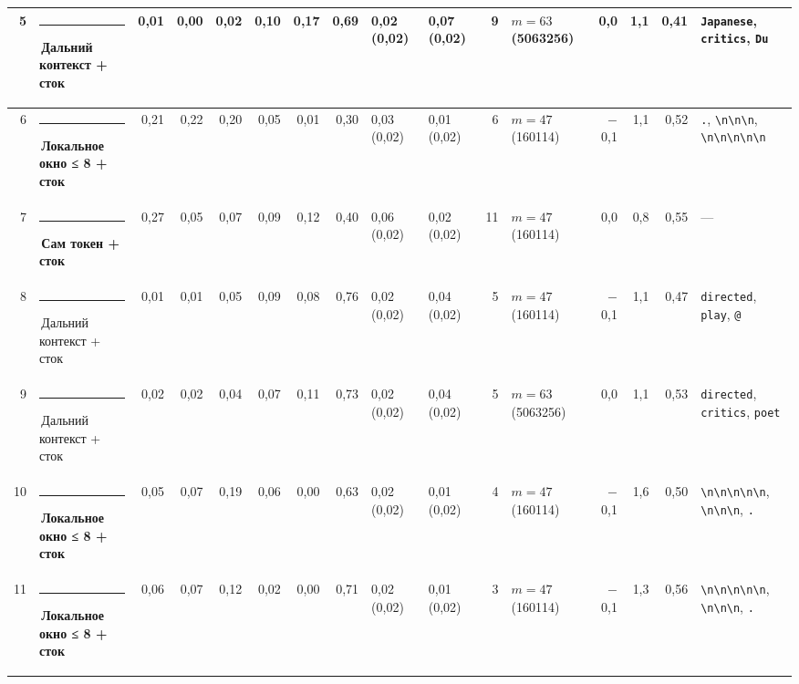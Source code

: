 \documentclass[10pt]{article}
\begin{document}
\begin{minipage}{\linewidth}
\begin{center}
{\begin{tabular}{|r|l|r|r|r|r|r|r|l|l|r|l|r|r|r|l|}
5 & \textcolor[HTML]{C3C2B7}{\rule{0.62em}{0.62em}}\,Дальний контекст + сток & 0,01 & 0,00 & 0,02 & 0,10 & 0,17 & 0,69 & 0,02 (0,02) & 0,07 (0,02) & 9 & $m{=}63$ (5063256) & 0,0 & 1,1 & 0,41 & \texttt{\textvisiblespace{}Japanese}, \texttt{\textvisiblespace{}critics}, \texttt{\textvisiblespace{}Du} \\ \hline
6 & \textcolor[HTML]{1BAF7A}{\rule{0.62em}{0.62em}}\,\textbf{Локальное окно ≤ 8 + сток} & 0,21 & 0,22 & 0,20 & 0,05 & 0,01 & 0,30 & 0,03 (0,02) & 0,01 (0,02) & 6 & $m{=}47$ (160114) & $-$0,1 & 1,1 & 0,52 & \texttt{\textvisiblespace{}.}, \texttt{\textvisiblespace{}\textbackslash{}n\textbackslash{}n\textbackslash{}n}, \texttt{\textvisiblespace{}\textbackslash{}n\textbackslash{}n\textbackslash{}n\textbackslash{}n\textbackslash{}n} \\ \hline
7 & \textcolor[HTML]{2A78D6}{\rule{0.62em}{0.62em}}\,\textbf{Сам токен + сток} & 0,27 & 0,05 & 0,07 & 0,09 & 0,12 & 0,40 & 0,06 (0,02) & 0,02 (0,02) & 11 & $m{=}47$ (160114) & 0,0 & 0,8 & 0,55 & — \\ \hline
8 & \textcolor[HTML]{C3C2B7}{\rule{0.62em}{0.62em}}\,Дальний контекст + сток & 0,01 & 0,01 & 0,05 & 0,09 & 0,08 & 0,76 & 0,02 (0,02) & 0,04 (0,02) & 5 & $m{=}47$ (160114) & $-$0,1 & 1,1 & 0,47 & \texttt{\textvisiblespace{}directed}, \texttt{\textvisiblespace{}play}, \texttt{\textvisiblespace{}@} \\ \hline
9 & \textcolor[HTML]{C3C2B7}{\rule{0.62em}{0.62em}}\,Дальний контекст + сток & 0,02 & 0,02 & 0,04 & 0,07 & 0,11 & 0,73 & 0,02 (0,02) & 0,04 (0,02) & 5 & $m{=}63$ (5063256) & 0,0 & 1,1 & 0,53 & \texttt{\textvisiblespace{}directed}, \texttt{\textvisiblespace{}critics}, \texttt{\textvisiblespace{}poet} \\ \hline
10 & \textcolor[HTML]{1BAF7A}{\rule{0.62em}{0.62em}}\,\textbf{Локальное окно ≤ 8 + сток} & 0,05 & 0,07 & 0,19 & 0,06 & 0,00 & 0,63 & 0,02 (0,02) & 0,01 (0,02) & 4 & $m{=}47$ (160114) & $-$0,1 & 1,6 & 0,50 & \texttt{\textvisiblespace{}\textbackslash{}n\textbackslash{}n\textbackslash{}n\textbackslash{}n\textbackslash{}n}, \texttt{\textvisiblespace{}\textbackslash{}n\textbackslash{}n\textbackslash{}n}, \texttt{\textvisiblespace{}.} \\ \hline
11 & \textcolor[HTML]{1BAF7A}{\rule{0.62em}{0.62em}}\,\textbf{Локальное окно ≤ 8 + сток} & 0,06 & 0,07 & 0,12 & 0,02 & 0,00 & 0,71 & 0,02 (0,02) & 0,01 (0,02) & 3 & $m{=}47$ (160114) & $-$0,1 & 1,3 & 0,56 & \texttt{\textvisiblespace{}\textbackslash{}n\textbackslash{}n\textbackslash{}n\textbackslash{}n\textbackslash{}n}, \texttt{\textvisiblespace{}\textbackslash{}n\textbackslash{}n\textbackslash{}n}, \texttt{\textvisiblespace{}.} \\ \hline

\end{tabular}}
\end{center}
\end{minipage}
\end{document}
